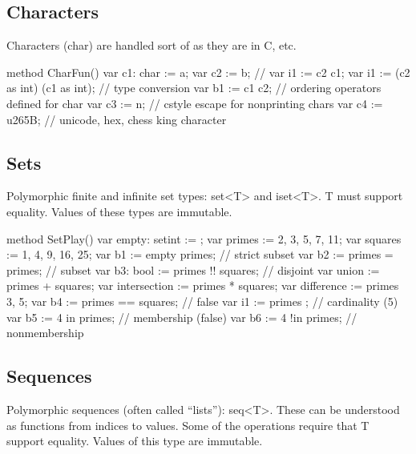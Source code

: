 \documentclass[letterpaper,10pt,english]{sphinxmanual}
\begin{document}
\subsection{Characters}
\label{\detokenize{06-dafny-language:characters}}
Characters (char) are handled sort of as they are in C, etc.

\begin{sphinxVerbatim}[commandchars=\\\{\}]
method CharFun()
\PYGZob{}
    var c1: char := \PYGZsq{}a\PYGZsq{};
    var c2 := \PYGZsq{}b\PYGZsq{};
    // var i1 := c2 \PYGZhy{} c1;
    var i1 := (c2 as int) \PYGZhy{} (c1 as int);    // type conversion
    var b1 := c1 \PYGZlt{} c2;  // ordering operators defined for char
    var c3 := \PYGZsq{}\PYGZbs{}n\PYGZsq{};     // c\PYGZhy{}style escape for non\PYGZhy{}printing chars
    var c4 := \PYGZsq{}\PYGZbs{}u265B\PYGZsq{}; // unicode, hex, \PYGZdq{}chess king\PYGZdq{} character
\PYGZcb{}
\end{sphinxVerbatim}


\subsection{Sets}
\label{\detokenize{06-dafny-language:sets}}
Polymorphic finite and infinite set types:
set\textless{}T\textgreater{} and iset\textless{}T\textgreater{}. T must support equality.
Values of these types are immutable.

\begin{sphinxVerbatim}[commandchars=\\\{\}]
method SetPlay()
\PYGZob{}
    var empty: set\PYGZlt{}int\PYGZgt{} := \PYGZob{}\PYGZcb{};
    var primes := \PYGZob{}2, 3, 5, 7, 11\PYGZcb{};
    var squares := \PYGZob{}1, 4, 9, 16, 25\PYGZcb{};
    var b1 := empty \PYGZlt{} primes;    // strict subset
    var b2 := primes \PYGZlt{}= primes;   // subset
    var b3: bool := primes !! squares; // disjoint
    var union := primes + squares;
    var intersection := primes * squares;
    var difference := primes \PYGZhy{} \PYGZob{}3, 5\PYGZcb{};
    var b4 := primes == squares;    // false
    var i1 := \textbar{} primes \textbar{};   // cardinality (5)
    var b5 := 4 in primes;  // membership (false)
    var b6 := 4 !in primes; // non\PYGZhy{}membership
\PYGZcb{}
\end{sphinxVerbatim}


\subsection{Sequences}
\label{\detokenize{06-dafny-language:sequences}}
Polymorphic sequences (often called “lists”): seq\textless{}T\textgreater{}. These can be
understood as functions from indices to values. Some of the operations
require that T support equality. Values of this type are immutable.
\end{document}
